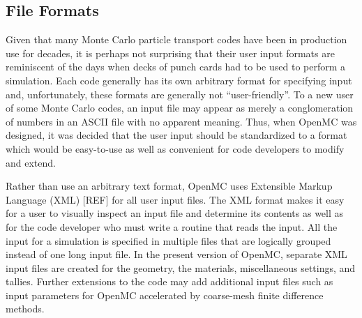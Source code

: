 \documentclass{elsarticle}
\begin{document}
\subsection{File Formats}

Given that many Monte Carlo particle transport codes have been in production use
for decades, it is perhaps not surprising that their user input formats are
reminiscent of the days when decks of punch cards had to be used to perform a
simulation. Each code generally has its own arbitrary format for specifying
input and, unfortunately, these formats are generally not ``user-friendly''. To
a new user of some Monte Carlo codes, an input file may appear as merely a
conglomeration of numbers in an ASCII file with no apparent meaning. Thus, when
OpenMC was designed, it was decided that the user input should be standardized
to a format which would be easy-to-use as well as convenient for code developers
to modify and extend.

Rather than use an arbitrary text format, OpenMC uses Extensible Markup Language
(XML) [REF] for all user input files. The XML format makes it easy for a user to
visually inspect an input file and determine its contents as well as for the
code developer who must write a routine that reads the input. All the input for
a simulation is specified in multiple files that are logically grouped instead
of one long input file. In the present version of OpenMC, separate XML input
files are created for the geometry, the materials, miscellaneous settings, and
tallies. Further extensions to the code may add additional input files such as
input parameters for OpenMC accelerated by coarse-mesh finite difference
methods.
\end{document}
